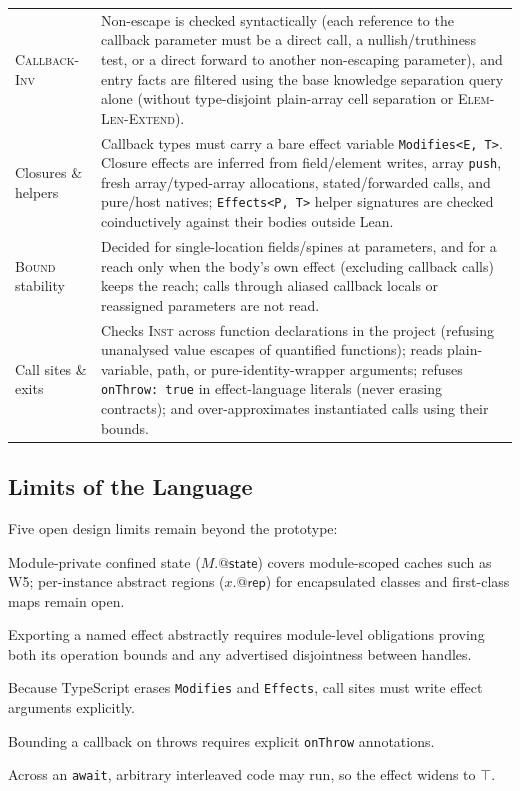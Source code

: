 \documentclass[10pt,a4paper]{article}
\makeatletter
\newcommand{\ruleName}[1]{\textcolor{rulec}{\textsc{#1}}}
\theoremstyle{definition}
\newcommand{\kw}[1]{\mathsf{#1}}
\newcommand{\code}[1]{\textcolor{codec}{\texttt{#1}}}
\newcommand{\modstate}[1]{#1.{@\kw{state}}}
\makeatother
\begin{document}
\begin{center}
\begin{tabularx}{\textwidth}{@{}lX@{}}
\ruleName{Callback-Inv} & Non-escape is checked syntactically (each reference to the callback parameter must be a direct call, a nullish/truthiness test, or a direct forward to another non-escaping parameter), and entry facts are filtered using the base knowledge separation query alone (without type-disjoint plain-array cell separation or \ruleName{Elem-Len-Extend}).\\
Closures \& helpers & Callback types must carry a bare effect variable \code{Modifies<E, T>}. Closure effects are inferred from field/element writes, array \code{push}, fresh array/typed-array allocations, stated/forwarded calls, and pure/host natives; \code{Effects<P, T>} helper signatures are checked coinductively against their bodies outside Lean.\\
\ruleName{Bound} stability & Decided for single-location fields/spines at parameters, and for a reach only when the body's own effect (excluding callback calls) keeps the reach; calls through aliased callback locals or reassigned parameters are not read.\\
Call sites \& exits & Checks \ruleName{Inst} across function declarations in the project (refusing unanalysed value escapes of quantified functions); reads plain-variable, path, or pure-identity-wrapper arguments; refuses \code{onThrow: true} in effect-language literals (never erasing contracts); and over-approximates instantiated calls using their bounds.\\
\bottomrule
\end{tabularx}
\end{center}

\subsection{Limits of the Language}

Five open design limits remain beyond the prototype:
\begin{description}[leftmargin=1.5em,itemsep=2pt]
\item[Per-instance confined state] Module-private confined state
  ($\modstate{M}$) covers module-scoped caches such as W5; per-instance
  abstract regions ($x.@\kw{rep}$) for encapsulated classes and
  first-class maps remain open.
\item[Abstract exported effects] Exporting a named effect abstractly
  requires module-level obligations proving both its operation bounds and
  any advertised disjointness between handles.
\item[Explicit instantiations] Because TypeScript erases \code{Modifies}
  and \code{Effects}, call sites must write effect arguments explicitly.
\item[Exceptional exits] Bounding a callback on throws requires explicit
  \code{onThrow} annotations.
\item[Concurrency / \code{await}] Across an \code{await}, arbitrary
  interleaved code may run, so the effect widens to $\top$.
\end{description}
\end{document}
